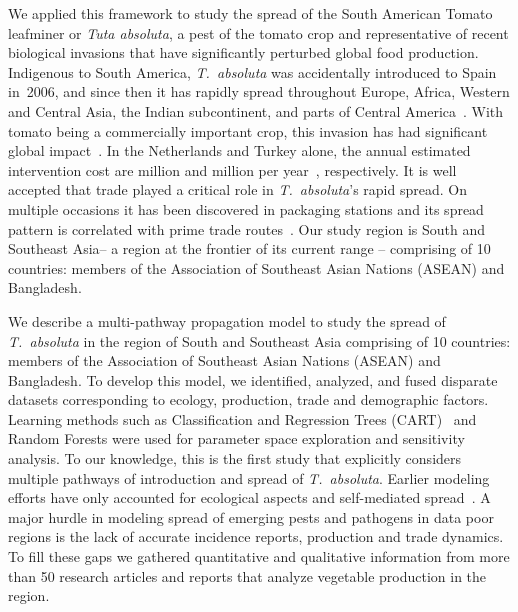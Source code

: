 \documentclass[11pt]{article}
\newcommand{\tuta}{\emph{T.~absoluta}}
\theoremstyle{definition}
\begin{document}
We applied this framework to study the spread of the South American Tomato
leafminer or \emph{Tuta absoluta}, a pest of the tomato crop and
representative of recent biological invasions that have significantly
perturbed global food production.  Indigenous to South America, \tuta{} was
accidentally introduced to Spain in~2006, and since then it has rapidly
spread throughout Europe, Africa, Western and Central Asia, the Indian
subcontinent, and parts of Central
America~\cite{desneux2010biological,biondi2017}. With tomato being a
commercially important crop, this invasion has had significant global
impact~\cite{campos2017western}. In the Netherlands and Turkey alone, the
annual estimated intervention cost are  million and 
million per year~\cite{}, respectively. It is well accepted that trade
played a critical role in \tuta{}'s rapid spread. On multiple occasions it
has been discovered in packaging stations and its spread pattern is
correlated with prime trade routes~\cite{karadjova2013tuta}. Our study
region is South and Southeast Asia-- a region at the frontier of its
current range -- comprising of 10 countries: members of the Association of
Southeast Asian Nations (ASEAN) and Bangladesh.

We describe a multi-pathway propagation model 
to study the spread of \tuta{} in the region of South
and Southeast Asia comprising of 10 countries: members of the Association
of Southeast Asian Nations (ASEAN) and Bangladesh. To develop this model,
we identified, analyzed, and fused disparate datasets corresponding to
ecology,  
production, trade 
and demographic factors. 
Learning methods such as Classification and Regression Trees
(CART)~\cite{breiman2017classification} and Random Forests were used for
parameter space exploration and sensitivity analysis.  To our knowledge,
this is the first study that explicitly considers multiple pathways of
introduction and spread of \tuta{}.  Earlier modeling efforts have only
accounted for ecological aspects and self-mediated
spread~\cite{desneux2010biological,tonnang2015identification,guimapi2016modeling}.
A major hurdle in modeling spread of emerging pests and pathogens in data
poor regions is the lack of accurate incidence reports, production and
trade dynamics. To fill these gaps we gathered quantitative and
qualitative information from more than 50 research articles and reports
that analyze vegetable production in the region.
\end{document}
